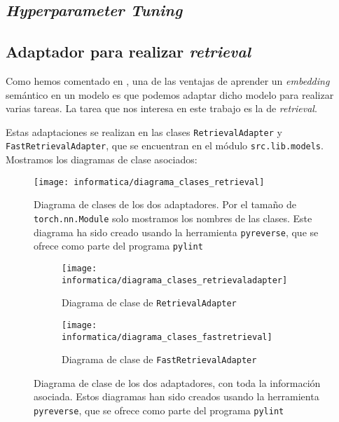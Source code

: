 \subsection{\textit{Hyperparameter Tuning}} \label{isec:hp_tuning}

\subsection{Adaptador para realizar \textit{retrieval}}

Como hemos comentado en , una de las ventajas de aprender un \textit{embedding} semántico en un modelo es que podemos adaptar dicho modelo para realizar varias tareas. La tarea que nos interesa en este trabajo es la de \textit{retrieval}.

Estas adaptaciones se realizan en las clases \lstinline{RetrievalAdapter} y \lstinline{FastRetrievalAdapter}, que se encuentran en el módulo \lstinline{src.lib.models}. Mostramos los diagramas de clase asociados:

\begin{figure}[H]
    \centering
    \texttt{[image: informatica/diagrama\_clases\_retrieval]}
    \caption{Diagrama de clases de los dos adaptadores. Por el tamaño de \lstinline{torch.nn.Module} solo mostramos los nombres de las clases. Este diagrama ha sido creado usando la herramienta \lstinline{pyreverse}, que se ofrece como parte del programa \lstinline{pylint}}
\end{figure}

\begin{figure}[H]
\centering
    \begin{subfigure}{.6\textwidth}
        \centering
        \texttt{[image: informatica/diagrama\_clases\_retrievaladapter]}
        \caption{Diagrama de clase de \lstinline{RetrievalAdapter}}
    \end{subfigure}%
    \begin{subfigure}{.4\textwidth}
        \centering
        \texttt{[image: informatica/diagrama\_clases\_fastretrieval]}
        \caption{Diagrama de clase de \lstinline{FastRetrievalAdapter}}
    \end{subfigure}
\caption{Diagrama de clase de los dos adaptadores, con toda la información asociada. Estos diagramas han sido creados usando la herramienta \lstinline{pyreverse}, que se ofrece como parte del programa \lstinline{pylint}}
\end{figure}

